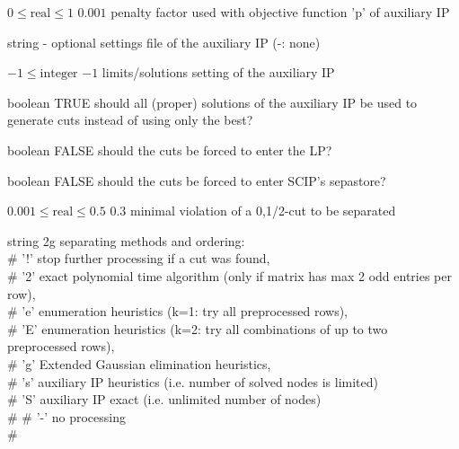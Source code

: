 %
{$0\leq\textrm{real}\leq1$}%
{$0.001$}%
{penalty factor used with objective function 'p' of auxiliary IP}%
{}

%
{string}%
{-}%
{optional settings file of the auxiliary IP (-: none)}%
{}

%
{$-1\leq\textrm{integer}$}%
{$-1$}%
{limits/solutions setting of the auxiliary IP}%
{}

%
{boolean}%
{TRUE}%
{should all (proper) solutions of the auxiliary IP be used to generate cuts instead of using only the best?}%
{}

%
{boolean}%
{FALSE}%
{should the cuts be forced to enter the LP?}%
{}

%
{boolean}%
{FALSE}%
{should the cuts be forced to enter SCIP's sepastore?}%
{}

%
{$0.001\leq\textrm{real}\leq0.5$}%
{$0.3$}%
{minimal violation of a {0,1/2}-cut to be separated}%
{}

%
{string}%
{2g}%
{separating methods and ordering:\\   \#                      '!' stop further processing if a cut was found,\\   \#                      '2' exact polynomial time algorithm (only if matrix has max 2 odd entries per row),\\   \#                      'e' enumeration heuristics (k=1: try all preprocessed rows),\\   \#                      'E' enumeration heuristics (k=2: try all combinations of up to two preprocessed rows),\\   \#                      'g' Extended Gaussian elimination heuristics,\\   \#                      's' auxiliary IP heuristics (i.e. number of solved nodes is limited)\\   \#                      'S' auxiliary IP exact      (i.e. unlimited number of nodes)\\   \#
   \#                      '-' no processing\\   \#}%
{}

